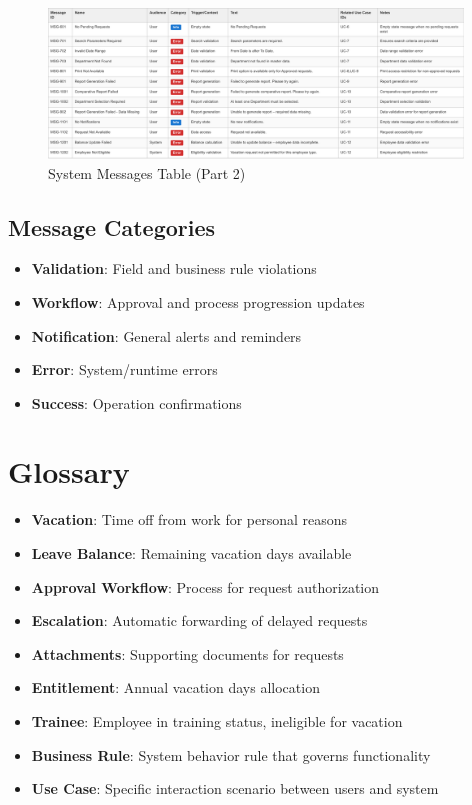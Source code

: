 \documentclass[12pt,a4paper]{article}
\begin{document}
\begin{figure}[H]
\centering
\includegraphics[width=0.98\textwidth]{Use-Cases/Messages-Table/Messages-Table-2.png}
\caption{System Messages Table (Part 2)}
\label{fig:messages-table-2}
\end{figure}

\subsection{Message Categories}
\begin{itemize}
    \item \textbf{Validation}: Field and business rule violations
    \item \textbf{Workflow}: Approval and process progression updates
    \item \textbf{Notification}: General alerts and reminders
    \item \textbf{Error}: System/runtime errors
    \item \textbf{Success}: Operation confirmations
\end{itemize}

\section{Glossary}
\begin{itemize}
    \item \textbf{Vacation}: Time off from work for personal reasons
    \item \textbf{Leave Balance}: Remaining vacation days available
    \item \textbf{Approval Workflow}: Process for request authorization
    \item \textbf{Escalation}: Automatic forwarding of delayed requests
    \item \textbf{Attachments}: Supporting documents for requests
    \item \textbf{Entitlement}: Annual vacation days allocation
    \item \textbf{Trainee}: Employee in training status, ineligible for vacation
    \item \textbf{Business Rule}: System behavior rule that governs functionality
    \item \textbf{Use Case}: Specific interaction scenario between users and system
\end{itemize}
\end{document}

